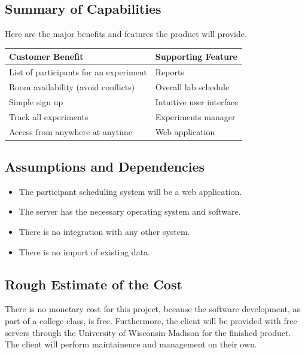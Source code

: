 \subsection{Summary of Capabilities}
Here are the major benefits and features the product will provide.
\begin{table}[!h]
    \begin{tabular}{|l|l|}
        \hline
        Customer Benefit & Supporting Feature \\ \hline
        List of participants for an experiment & Reports \\ \hline
        Room availability (avoid conflicts) & Overall lab schedule \\ \hline
        Simple sign up & Intuitive user interface \\ \hline
        Track all experiments & Experiments manager \\ \hline
        Access from anywhere at anytime & Web application \\ \hline
    \end{tabular}
\end{table}
\subsection{Assumptions and Dependencies}
\begin{itemize}
\item The participant scheduling system will be a web application.
\item The server has the necessary operating system and software.
\item There is no integration with any other system.
\item There is no import of existing data.
\end{itemize}
\subsection{Rough Estimate of the Cost}
There is no monetary cost for this project, because the software development, as part of a college class, is free. Furthermore, the client will be provided with free servers through the University of Wisconsin-Madison for the finished product. The client will perform maintainence and management on their own.
\clearpage
